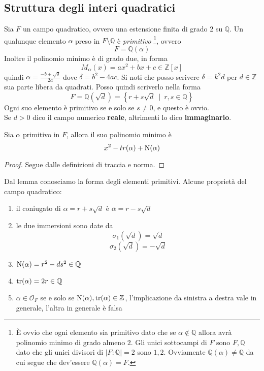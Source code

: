 \subsection{Struttura degli interi quadratici}
Sia $F$ un campo quadratico, ovvero una estensione finita di grado 2 su $\mathbb{Q}$. Un qualunque elemento $\alpha$ preso in $F\setminus\mathbb{Q}$ è \textit{primitivo}
\footnote{È ovvio che ogni elemento sia primitivo dato che se $\alpha \notin \mathbb{Q}$ 
	allora avrà polinomio minimo di grado almeno $2$. 
	Gli unici sottocampi di $F$ sono $F, \mathbb{Q}$ dato che gli unici divisori di 
	$|F \colon \mathbb{Q}| = 2$ sono $1,2$. Ovviamente $\mathbb{Q}(\alpha) \neq \mathbb{Q}$ 
	da cui segue che dev'essere $\mathbb{Q}(\alpha) = F$.}, ovvero 
\begin{equation*}
F=\mathbb{Q}(\alpha)
\end{equation*}
Inoltre il polinomio minimo è di grado due, in forma 
\begin{equation*}
M_\alpha(x)=ax^2+bx+c\in\mathbb{Z}[x]
\end{equation*}
quindi $\alpha=\frac{-b\pm\sqrt{\delta}}{2a}$ dove $\delta=b^2-4ac$. Si noti che posso scrivere $\delta=k^2d$ per $d\in\mathbb{Z}$ sua parte libera da quadrati. Posso quindi scriverlo nella forma 
\begin{equation*}
F=\mathbb{Q}(\sqrt{d})=\left\{r+s\sqrt{d}\ \mid \ r,s\in\mathbb{Q}\right\}
\end{equation*}
Ogni suo elemento è primitivo se e solo se $s\neq0$, e questo è ovvio. \\ Se $d>0$ dico il campo numerico \textbf{reale}, altrimenti lo dico \textbf{immaginario}.
\begin{lemma}
	Sia $\alpha$ primitivo in $F$, allora il suo polinomio minimo è 
	\begin{equation*}
	x^2-tr(\alpha)+\operatorname{N}(\alpha)
	\end{equation*}
\end{lemma}
\begin{proof}
	Segue dalle definizioni di traccia e norma. 
\end{proof}
\begin{osservazione}
	Dal lemma conosciamo la forma degli elementi primitivi. Alcune proprietà del campo quadratico:
	\begin{enumerate}
		\item il coniugato di $\alpha=r+s\sqrt{d}$ è $\overline{\alpha}=r-s\sqrt{d}$
		\item le due immersioni sono date da 
		\begin{equation*}
		\sigma_1(\sqrt{d})=\sqrt{d}
		\end{equation*}
		\begin{equation*}
		\sigma_2(\sqrt{d})=-\sqrt{d}
		\end{equation*}
		\item $\operatorname{N}(\alpha)=r^2-ds^2\in\mathbb{Q}$
		\item $\operatorname{tr}(\alpha)=2r\in\mathbb{Q}$
		\item $\alpha\in \mathcal{O}_F$ se e solo se $\operatorname{N}(\alpha),\operatorname{tr}(\alpha)\in\mathbb{Z}$, l'implicazione da sinistra a destra vale in generale, l'altra in generale è falsa
	\end{enumerate}
\end{osservazione}
